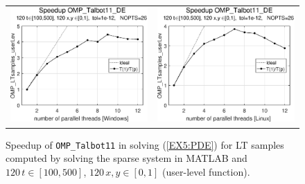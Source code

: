 \documentclass[a4paper,10pt]{report}%
\begin{document}
\begin{figure}[htb]
\centering
\begin{tabular}{cc} %
\includegraphics[height=0.2\textwidth]{./FIGS/EX5/EX5_userLev_speedup_11_Windows.eps} &
\includegraphics[height=0.2\textwidth]{./FIGS/EX5/EX5_userLev_speedup_11_Linux.eps}
\end{tabular}
\caption{\small Speedup of {\tt OMP\_Talbot11} in solving (\ref{EX5:PDE}) for LT samples computed by
solving the sparse system in MATLAB and $120\,t\in[100,500]$, $120\,x,y\in[0,1]$ (user-level function).}
\label{PAR_EX5_speedup_userLev}
\end{figure}


\end{document}
